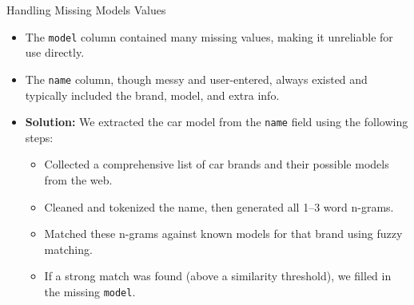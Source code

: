 \documentclass{beamer}
\begin{document}
\begin{frame}{Handling Missing Models Values}
        \begin{itemize}
                \item The \texttt{model} column contained many missing values,
                        making it unreliable for use directly.
                \item The \texttt{name} column, though messy and user-entered,
                        always existed and typically included the brand, model,
                        and extra info.
                \item \textbf{Solution:} We extracted the car model from the
                        \texttt{name} field using the following steps:
                        \begin{itemize}
                                \item Collected a comprehensive list of car
                                        brands and their possible models from
                                        the web.
                                \item Cleaned and tokenized the name, then
                                        generated all 1–3 word n-grams.
                                \item Matched these n-grams against known
                                        models for that brand using fuzzy
                                        matching.
                                \item If a strong match was found (above a
                                        similarity threshold), we filled in the
                                        missing \texttt{model}.
                        \end{itemize}
        \end{itemize}
\end{frame}
\end{document}
